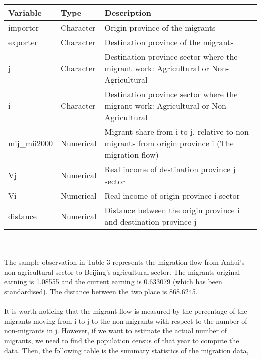 \documentclass{article}
\begin{document}
\begin{table}[H]
\centering
\captionsetup{labelfont=bf}
\label{tab:title}
\begin{tabular}{lll}
  \hline
  Variable & Type & Description \\ 
  \hline
  importer & Character &  Origin province of the migrants\\
  exporter  & Character &   Destination province of the migrants\\ 
  j & Character &  Destination province sector where the migrant work: Agricultural or Non-Agricultural \\
  i& Character &  Destination province sector where the migrant work: Agricultural or Non-Agricultural  \\
  mij\_mii2000 & Numerical & Migrant share from i to j, relative to non migrants from origin province i (The migration flow)\\
  Vj & Numerical & Real income of destination province j sector\\
  Vi & Numerical & Real income of origin province i sector\\
  distance & Numerical & Distance between the origin province i and destination province j\\
   \hline
\end{tabular}
\end{table}

\\~\\
The sample observation in Table 3 represents the migration flow from Anhui's non-agricultural sector to  Beijing's agricultural sector. The migrants original earning is 1.08555 and the current earning is 0.633079 (which has been standardised). The distance between the two place is 868.6245.
\\~\\
It is worth noticing that the migrant flow is measured by the percentage of the migrants moving from i to j to the non-migrants with respect to the number of non-migrants in j. However, if we want to estimate the actual number of migrants, we need to find the population census of that year to compute the data. Then, the following table is the summary statistics of the migration data,
\end{document}
